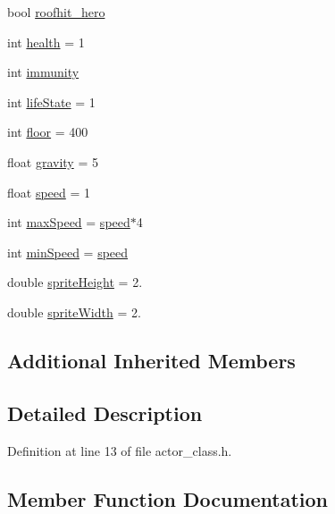 \begin{DoxyCompactItemize}
\item 
bool \hyperlink{class_actor___class_ae4069280f354c6ed5efd8a663c949338}{roofhit\+\_\+hero}
\item 
int \hyperlink{class_actor___class_adfbd9eb605a74c1a9d9da3df90a92aea}{health} = 1
\item 
int \hyperlink{class_actor___class_a183384213048a1b5a8b62ca1de090ae2}{immunity}
\item 
int \hyperlink{class_actor___class_ac71f1b0f8ee1403bc8ce8b5da823e2e6}{life\+State} = 1
\item 
int \hyperlink{class_actor___class_a4c38df985dea8585c3de3eea8eab6514}{floor} = 400
\item 
float \hyperlink{class_actor___class_a9da6be86a6bac1e8bd4ba051fbad7eee}{gravity} = 5
\item 
float \hyperlink{class_actor___class_af833d1fff0db17c4e797836ffbae9f9e}{speed} = 1
\item 
int \hyperlink{class_actor___class_adbd0ae08bc516686efb88230183168c7}{max\+Speed} = \hyperlink{class_actor___class_af833d1fff0db17c4e797836ffbae9f9e}{speed}$\ast$4
\item 
int \hyperlink{class_actor___class_ab3e44e44838da370bb07cfe647cbd2d3}{min\+Speed} = \hyperlink{class_actor___class_af833d1fff0db17c4e797836ffbae9f9e}{speed}
\item 
double \hyperlink{class_actor___class_a9788b5985fcd281bc5fe722937e7413c}{sprite\+Height} = 2.
\item 
double \hyperlink{class_actor___class_a58010eaaca47d2e529d11f898fadebb9}{sprite\+Width} = 2.
\end{DoxyCompactItemize}
\subsection*{Additional Inherited Members}


\subsection{Detailed Description}


Definition at line 13 of file actor\+\_\+class.\+h.



\subsection{Member Function Documentation}
\hypertarget{class_actor___class_ab8e23ffae108da3b8eda67c6753bdae0}{}\label{class_actor___class_ab8e23ffae108da3b8eda67c6753bdae0} 
